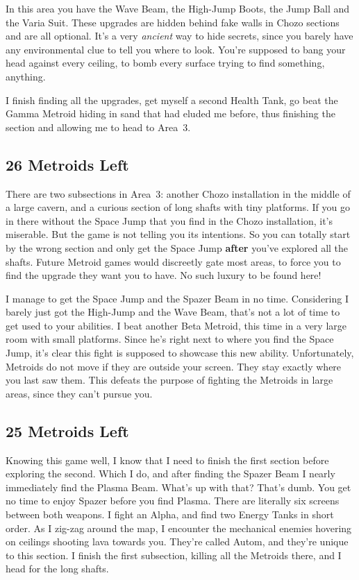 \documentclass{book}
\begin{document}
In this area you have the Wave Beam, the High-Jump Boots, the Jump Ball and the Varia Suit. These upgrades are hidden behind fake walls in Chozo sections and are all optional. It’s a very \emph{ancient} way to hide secrets, since you barely have any environmental clue to tell you where to look. You’re supposed to bang your head against every ceiling, to bomb every surface trying to find something, anything.

I finish finding all the upgrades, get myself a second Health Tank, go beat the Gamma Metroid hiding in sand that had eluded me before, thus finishing the section and allowing me to head to Area~3.

\subsection*{26 Metroids Left}\nopagebreak[4]

There are two subsections in Area~3: another Chozo installation in the middle of a large cavern, and a curious section of long shafts with tiny platforms. If you go in there without the Space Jump that you find in the Chozo installation, it’s miserable. But the game is not telling you its intentions. So you can totally start by the wrong section and only get the Space Jump \textbf{after} you’ve explored all the shafts. Future Metroid games would discreetly gate most areas, to force you to find the upgrade they want you to have. No such luxury to be found here!

I manage to get the Space Jump and the Spazer Beam in no time. Considering I barely just got the High-Jump and the Wave Beam, that’s not a lot of time to get used to your abilities. I beat another Beta Metroid, this time in a very large room with small platforms. Since he’s right next to where you find the Space Jump, it’s clear this fight is supposed to showcase this new ability. Unfortunately, Metroids do not move if they are outside your screen. They stay exactly where you last saw them. This defeats the purpose of fighting the Metroids in large areas, since they can’t pursue you.

\subsection*{25 Metroids Left}\nopagebreak[4]

Knowing this game well, I know that I need to finish the first section before exploring the second. Which I do, and after finding the Spazer Beam I nearly immediately find the Plasma Beam. What’s up with that? That’s dumb. You get no time to enjoy Spazer before you find Plasma. There are literally six screens between both weapons. I fight an Alpha, and find two Energy Tanks in short order. As I zig-zag around the map, I encounter the mechanical enemies hovering on ceilings shooting lava towards you. They’re called Autom, and they’re unique to this section. I finish the first subsection, killing all the Metroids there, and I head for the long shafts.
\end{document}
